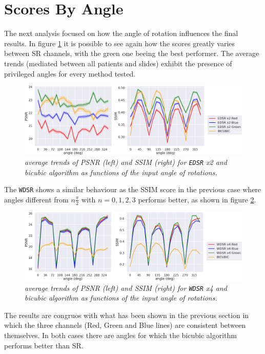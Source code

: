 \documentclass[12pt,a4paper]{report}
\begin{document}
\section{Scores By Angle}

The next analysis focused on how the angle of rotation influences the final results. In figure \ref{fig:edsr-angles} it is possible to see again how the scores greatly varies between SR channels, with the green one beeing the best performer. The average trends (mediated between all patients and slides) exhibit the presence of privileged angles for every method tested.

\begin{figure}[H]
 \centering
 \includegraphics[scale=0.3]{./images/edsr-angles.png}
 \caption{\it average trends of PSNR (left) and SSIM (right) for {\tt EDSR} x2 and bicubic algorithm as functions of the input angle of rotations.}
 \label{fig:edsr-angles}
\end{figure}

The {\tt WDSR} shows a similar behaviour as the SSIM score in the previous case where angles different from $n \frac{\pi}{2}$ with $n = 0, 1, 2, 3$ performs better, as shown in figure \ref{fig:wdsr-angles}.   

\begin{figure}[H]
 \centering
 \includegraphics[scale=0.3]{./images/wdsr-angles.png}
 \caption{\it average trends of PSNR (left) and SSIM (right) for {\tt WDSR} x4 and bicubic algorithm as functions of the input angle of rotations.}
 \label{fig:wdsr-angles}
\end{figure}

The results are congruos with what has been shown in the previous section in which the three channels (Red, Green and Blue lines) are consistent between themselves.
In both cases there are angles for which the bicubic algorithm performs better than SR.
\end{document}
